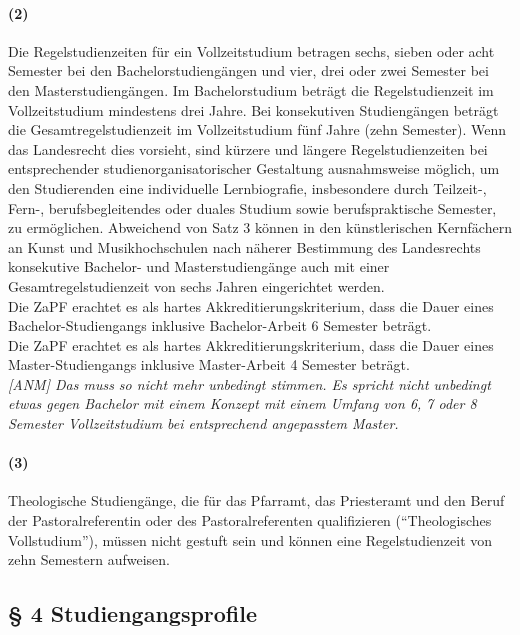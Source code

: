 \documentclass[a4paper]{scrartcl}
\begin{document}
\paragraph{(2)} Die Regelstudienzeiten für ein Vollzeitstudium betragen sechs, sieben oder acht Semester bei den Bachelorstudiengängen und vier, drei oder zwei Semester bei den Masterstudiengängen. Im Bachelorstudium beträgt die Regelstudienzeit im Vollzeitstudium mindestens drei Jahre. Bei konsekutiven Studiengängen beträgt die Gesamtregelstudienzeit im Vollzeitstudium fünf Jahre (zehn Semester). Wenn das Landesrecht dies vorsieht, sind kürzere und längere Regelstudienzeiten bei entsprechender studienorganisatorischer  Gestaltung ausnahmsweise möglich, um den Studierenden eine individuelle Lernbiografie, insbesondere durch Teilzeit-, Fern-, berufsbegleitendes oder duales Studium sowie berufspraktische Semester, zu ermöglichen.
Abweichend von Satz 3 können in den künstlerischen Kernfächern an Kunst und Musikhochschulen nach näherer Bestimmung des Landesrechts konsekutive Bachelor- und Masterstudiengänge auch mit einer Gesamtregelstudienzeit von sechs Jahren eingerichtet werden.\\

\textcolor{Bernd}{\textbf{\cite{RESO: SoSe2002-RL}} Die ZaPF erachtet es als hartes Akkreditierungskriterium, dass die Dauer eines Bachelor-Studiengangs inklusive Bachelor-Arbeit 6 Semester beträgt.}\\

\textcolor{Bernd}{\textbf{\cite{RESO: SoSe2002-RL}} Die ZaPF erachtet es als hartes Akkreditierungskriterium, dass die Dauer eines Master-Studiengangs inklusive Master-Arbeit 4 Semester beträgt.}\\

\emph{\textcolor{Brutus}{[ANM] Das muss so nicht mehr unbedingt stimmen. Es spricht nicht unbedingt etwas gegen Bachelor mit einem Konzept mit einem Umfang von 6, 7 oder 8 Semester Vollzeitstudium bei entsprechend angepasstem Master.}}

\paragraph{(3)} Theologische Studiengänge, die für das Pfarramt, das Priesteramt und den Beruf der Pastoralreferentin oder des Pastoralreferenten qualifizieren (\enquote{Theologisches Vollstudium}), müssen nicht gestuft sein und können eine Regelstudienzeit von zehn Semestern aufweisen.
\subsection{§ 4 Studiengangsprofile}
\end{document}
